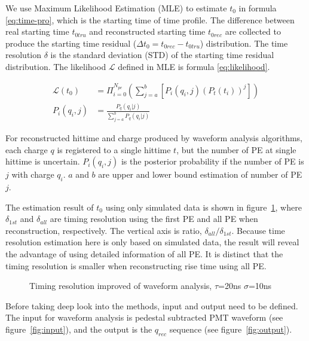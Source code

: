 We use Maximum Likelihood Estimation (MLE) to estimate $t_{0}$ in formula \eqref{eq:time-pro}, which is the starting time of time profile. The difference between real starting time $t_{0tru}$ and reconstructed starting time $t_{0rec}$ are collected to produce the starting time residual ($\Delta t_{0}=t_{0rec}-t_{0tru}$) distribution. The time resolution $\delta$ is the standard deviation (STD) of the starting time residual distribution. The likelihood $\mathcal{L}$ defined in MLE is formula \eqref{eq:likelihood}. 

\begin{align}
    \mathcal{L}(t_{0}) &= \Pi_{i=0}^{N_{pe}}\left(\sum_{j=a}^{b}[P_{i}(q_{i},j)(P_{t}(t_{i}))^{j}]\right)
    \label{eq:likelihood} \\
    P_{i}(q_{i},j) &= \frac{P_{q}(q_{i}|j)}{\sum_{j=a}^{b}P_{q}(q_{i}|j)}
\end{align}

For reconstructed hittime and charge produced by waveform analysis algorithms, each charge $q$ is registered to a single hittime $t$, but the number of PE at single hittime is uncertain. $P_{i}(q_{i},j)$ is the posterior probability if the number of PE is $j$ with charge $q_{i}$. $a$ and $b$ are upper and lower bound estimation of number of PE $j$. 

The estimation result of $t_{0}$ using only simulated data is shown in figure~\ref{fig:reso-diff}, where $\delta_{1st}$ and $\delta_{all}$ are timing resolution using the first PE and all PE when reconstruction, respectively. The vertical axis is ratio, $\delta_{all}/\delta_{1st}$. Because time resolution estimation here is only based on simulated data, the result will reveal the advantage of using detailed information of all PE. It is distinct that the timing resolution is smaller when reconstructing rise time using all PE. 

\begin{figure}[H]
    \centering
    \scalebox{0.7}{}
    \caption{\label{fig:reso-diff} Timing resolution improved of waveform analysis, $\tau$=20ns $\sigma$=10ns}
\end{figure}

Before taking deep look into the methods, input and output need to be defined. The input for waveform analysis is pedestal subtracted PMT waveform (see figure~\ref{fig:input}), and the output is the $q_{rec}$ sequence (see figure~\ref{fig:output}). 

